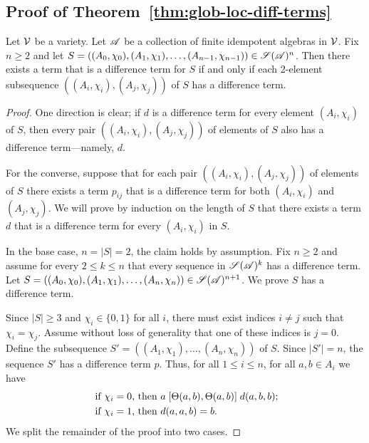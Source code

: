 \subsection{Proof of Theorem~\ref{thm:glob-loc-diff-terms}}
\label{sec:proof-thm:glob}
\begin{theorem}[\ref{thm:glob-loc-diff-terms}]
  Let $\mathcal{V}$ be a variety.  Let $\mathscr{A}$ be a collection of finite idempotent
  algebras in $\mathcal{V}$. Fix $n\geq 2$ and 
  let $S= ((A_0, \chi_0), (A_1, \chi_1), \dots, (A_{n-1}, \chi_{n-1}))\in \mathscr{S}(\mathscr{A})^n$.
  Then there exists a term that is a \glocal difference term for $S$
  if and only if each 2-element subsequence $((A_i,\chi_i), (A_j,\chi_j))$ of $S$
  has a \glocal difference term.
\end{theorem}
\begin{proof}
  One direction is clear; if $d$ is a \glocal difference term for every
  element $(A_i, \chi_i)$ of $S$, then  every pair $((A_i,\chi_i),
  (A_j,\chi_j))$ of elements of $S$ also has a \glocal difference
  term---namely, $d$.

  For the converse, suppose that
  for each pair $((A_i,\chi_i), (A_j,\chi_j))$ of elements of $S$ there exists a
  term $p_{ij}$ that is a \glocal difference term for both
  $(A_i,\chi_i)$ and $(A_j,\chi_j)$.
  We will prove by induction on the length of $S$ that
  there exists a term $d$ that is a \glocal difference term for every
  $(A_i, \chi_i)$ in $S$.

  In the base case, $n = |S| = 2$, the claim holds by assumption.
  Fix $n\geq 2$ and assume for every
  $2\leq k \leq n$ that every sequence in $\mathscr{S}(\mathscr{A})^k$
  has a \glocal difference term. Let
  $S = ((A_0, \chi_0), (A_1, \chi_1), \dots, (A_{n},\chi_{n})) \in \mathscr{S}(\mathscr{A})^{n+1}$.
  We prove  $S$ has a \glocal difference term.

  Since $|S| \geq 3$ and $\chi_i \in \{0,1\}$ for all $i$, there must exist
  indices $i\neq j$ such that $\chi_i = \chi_j$. Assume without loss of generality
  that one of these indices is $j=0$.  Define the subsequence
  $S' = ((A_1, \chi_1), \dots,(A_{n},\chi_{n}))$ of $S$. %
  Since $|S'| = n$, the sequence $S'$ has a \glocal difference term $p$.
  Thus, for all $1\leq i \leq n$,
  for all $a, b\in A_i$  we have
  \begin{align*}
    \text{ if $\chi_i=0$, then } &
    a \mathrel{[\Theta(a,b), \Theta(a,b)]} d(a,b,b);\\
    \text{ if $\chi_i=1$, then } &
    d(a,a,b) = b.
  \end{align*}
  We split the remainder of the proof into two cases.


\end{proof}
